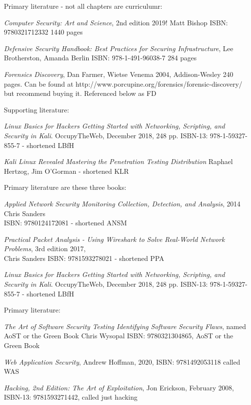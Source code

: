 \documentclass[Screen16to9,17pt]{foils}
\begin{document}

Primary literature - not all chapters are curriculumr:
\begin{list2}
\item \emph{Computer Security: Art and Science}, 2nd edition 2019! Matt Bishop ISBN: 9780321712332 1440 pages
\item \emph{Defensive Security Handbook: Best Practices for Securing Infrastructure}, Lee Brotherston, Amanda Berlin ISBN: 978-1-491-96038-7 284 pages
\item \emph{Forensics Discovery}, Dan Farmer, Wietse Venema 2004, Addison-Wesley 240 pages. Can be found at http://www.porcupine.org/forensics/forensic-discovery/ but recommend buying it. Referenced below as FD

\end{list2}
Supporting literature:
\begin{list2}
\item \emph{Linux Basics for Hackers Getting Started with Networking, Scripting, and Security in Kali}. OccupyTheWeb, December 2018, 248 pp. ISBN-13: 978-1-59327-855-7 - shortened LBfH
\item \emph{Kali Linux Revealed  Mastering the Penetration Testing Distribution}
Raphael Hertzog, Jim O'Gorman - shortened KLR
\end{list2}


Primary literature are these three books:
\begin{list2}
\item \emph{Applied Network Security Monitoring Collection, Detection, and Analysis}, 2014 Chris Sanders \\
ISBN: 9780124172081 - shortened ANSM
\item \emph{Practical Packet Analysis - Using Wireshark to Solve Real-World Network Problems}, 3rd edition 2017, \\
Chris Sanders ISBN: 9781593278021 - shortened PPA
\item \emph{Linux Basics for Hackers Getting Started with Networking, Scripting, and Security in Kali}. OccupyTheWeb, December 2018, 248 pp. ISBN-13: 978-1-59327-855-7 - shortened LBfH
\end{list2}


Primary literature:
\begin{list2}
\item \emph{The Art of Software Security Testing Identifying Software Security Flaws}, named AoST or the Green Book
Chris Wysopal ISBN: 9780321304865, AoST or the Green Book
\item \emph{Web Application Security}, Andrew Hoffman, 2020, ISBN: 9781492053118 called WAS
\item \emph{Hacking, 2nd Edition: The Art of Exploitation}, Jon Erickson, February 2008, ISBN-13: 9781593271442, called just hacking
\end{list2}
\end{document}
